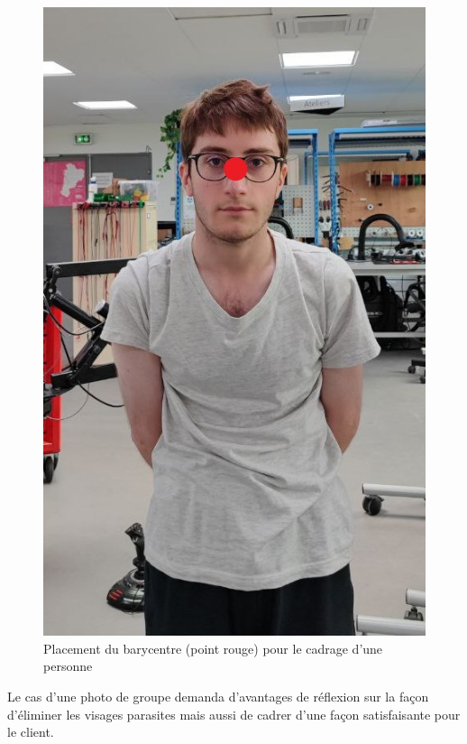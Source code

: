 \documentclass[a4paper,french]{article}
\begin{document}
\begin{figure}[H]
    \centering
    \includegraphics[scale=0.5]{figures/bary_solo.jpg}
    \caption{Placement du barycentre (point rouge) pour le cadrage d'une personne}
    \label{fig:Bary_solo}
\end{figure}

Le cas d'une photo de groupe demanda d'avantages de réflexion sur la façon d'éliminer les visages parasites mais aussi de cadrer d'une façon satisfaisante pour le client.\\
\end{document}
